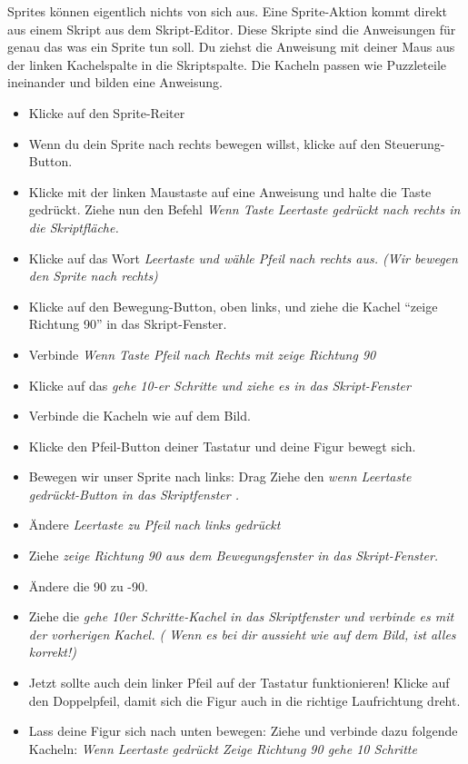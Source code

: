 Sprites können eigentlich nichts von sich aus. Eine Sprite-Aktion kommt direkt aus einem Skript aus dem Skript-Editor. Diese Skripte sind die Anweisungen für genau das was ein Sprite tun soll.
Du ziehst die Anweisung mit deiner Maus aus der linken Kachelspalte in die Skriptspalte. Die Kacheln passen wie Puzzleteile ineinander und bilden eine Anweisung.


\begin{itemize}
\item Klicke auf den Sprite-Reiter
\item Wenn du dein Sprite nach rechts bewegen willst, klicke auf den Steuerung-Button.
\item Klicke mit der linken Maustaste auf eine Anweisung und halte die Taste gedrückt. Ziehe nun den Befehl
 \it{Wenn Taste Leertaste gedrückt} nach rechts in die Skriptfläche. 
\item Klicke auf das Wort \it{Leertaste} und wähle \it{Pfeil nach rechts} aus.  (Wir bewegen den Sprite nach rechts)
\item Klicke auf den Bewegung-Button, oben links, und ziehe die Kachel “zeige Richtung 90” in das Skript-Fenster.
\item Verbinde \it{Wenn Taste Pfeil nach Rechts} mit \it{zeige Richtung 90}
\item Klicke auf das \it{gehe 10-er Schritte} und ziehe es in das Skript-Fenster 
\item Verbinde die Kacheln wie auf dem Bild. 
\item Klicke den Pfeil-Button deiner Tastatur und deine Figur bewegt sich.
\item Bewegen wir unser Sprite nach links: Drag Ziehe den \it{wenn Leertaste gedrückt}-Button in das Skriptfenster .
\item Ändere \it{Leertaste} zu \it{Pfeil nach links gedrückt}
\item Ziehe \it{zeige Richtung 90} aus dem Bewegungsfenster in das Skript-Fenster.
\item Ändere die 90 zu -90.
\item Ziehe die \it{gehe 10er Schritte}-Kachel in das Skriptfenster und verbinde es mit der vorherigen Kachel.
( Wenn es bei dir aussieht wie auf dem Bild, ist alles korrekt!)
\item Jetzt sollte auch dein linker Pfeil auf der Tastatur funktionieren! Klicke auf den Doppelpfeil, damit sich die Figur auch in die richtige Laufrichtung dreht. 
\item Lass deine Figur sich nach unten bewegen: Ziehe und verbinde dazu folgende Kacheln:
\subitem \it{Wenn Leertaste gedrückt}
\subitem \it{Zeige Richtung 90}
\subitem \it{gehe 10 Schritte}
\end{itemize}


